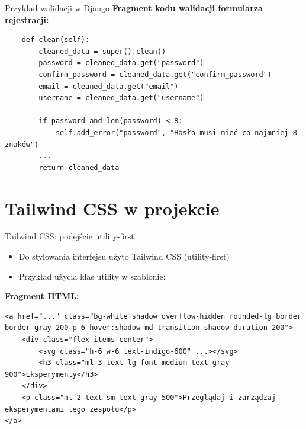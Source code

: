 \documentclass[polish,aspectratio=1610]{beamer}
\begin{document}
    \begin{frame}[fragile]{Przykład walidacji w Django}
        \textbf{Fragment kodu walidacji formularza rejestracji:}
        \begin{verbatim}
    def clean(self):
        cleaned_data = super().clean()
        password = cleaned_data.get("password")
        confirm_password = cleaned_data.get("confirm_password")
        email = cleaned_data.get("email")
        username = cleaned_data.get("username")

        if password and len(password) < 8:
            self.add_error("password", "Hasło musi mieć co najmniej 8 znaków")
        ...
        return cleaned_data
        \end{verbatim}
    \end{frame}

    \section{Tailwind CSS w projekcie}
    \begin{frame}[fragile]{Tailwind CSS: podejście utility-first}
        \begin{itemize}
            \item Do stylowania interfejsu użyto Tailwind CSS (utility-first)
            \item Przykład użycia klas utility w szablonie:
        \end{itemize}
        \vspace{0.5em}
        \textbf{Fragment HTML:}
        \begin{verbatim}
<a href="..." class="bg-white shadow overflow-hidden rounded-lg border border-gray-200 p-6 hover:shadow-md transition-shadow duration-200">
    <div class="flex items-center">
        <svg class="h-6 w-6 text-indigo-600" ...></svg>
        <h3 class="ml-3 text-lg font-medium text-gray-900">Eksperymenty</h3>
    </div>
    <p class="mt-2 text-sm text-gray-500">Przeglądaj i zarządzaj eksperymentami tego zespołu</p>
</a>
        \end{verbatim}
    \end{frame}

\end{document}
